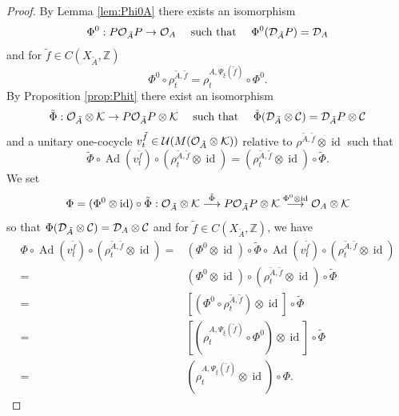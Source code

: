 \documentclass[11pt]{article}
\theoremstyle{plain}
\theoremstyle{definition}
\numberwithin{equation}{section}
\newcommand{\id}{\operatorname{id}}
\newcommand{\Ad}{\operatorname{Ad}}
\newcommand{\Z}{\mathbb{Z}}
\newcommand{\f}{\tilde{f}}
\begin{document}
\begin{proof}
By Lemma \ref{lem:Phi0A}
there exists an isomorphism
\begin{equation*}
\Phi^0: P{{\mathcal{O}}_{\tilde{A}}} P \rightarrow {{\mathcal{O}}_A}
\quad
\text{ such that }
\quad
\Phi^0({{\mathcal{D}}_{\tilde{A}}} P) = {{\mathcal{D}}_A}
\end{equation*}
and for $ \f \in C(X_{\tilde{A}},\Z)$
\begin{equation*}
\Phi^0 \circ \rho^{\tilde{A},\f}_t = \rho^{A, \Psi_\xi(\f)}_t\circ \Phi^0.
\end{equation*}
By Proposition \ref{prop:Phit}
there exist an isomorphism
\begin{equation*}
\tilde{\Phi}:{{\mathcal{O}}_{\tilde{A}}\otimes{\mathcal{K}}} 
\rightarrow 
P{\mathcal{O}}_{\tilde{A}}P \otimes{\mathcal{K}}
\quad
\text{  such that }
\quad
 \tilde{\Phi}({{\mathcal{D}}_{\tilde{A}}\otimes{\mathcal{C}}}) = 
{\mathcal{D}}_{\tilde{A}}P \otimes{\mathcal{C}}
\end{equation*}
and 
a unitary one-cocycle
 $v_t^{\f} \in \U(M(\SOTA))$ 
 relative to 
$\rho^{\tilde{A},\f} \otimes\id$
such that 
\begin{equation*}
\tilde{\Phi} \circ \Ad(v_t^{\f}) \circ (\rho^{\tilde{A},\f}_t\otimes \id)
 = (\rho^{\tilde{A},\f}_t\otimes\id) \circ \tilde{\Phi}.
\end{equation*}
We set
\begin{equation*}
\Phi= ({\Phi^0}\otimes \id) \circ {\tilde{\Phi}} :
\SOTA 
\overset{\tilde{\Phi}}{\longrightarrow}
P{\mathcal{O}}_{\tilde{A}}P \otimes{\mathcal{K}}
\overset{{\Phi^0}\otimes \id}{\longrightarrow}
\SOA
\end{equation*}
so that 
$
\Phi({{\mathcal{D}}_{\tilde{A}}\otimes{\mathcal{C}}})
= {{\mathcal{D}}_A}\otimes{\mathcal{C}}
$
and for $\f \in C(X_{\tilde{A}},\Z)$, we have
\begin{align*}
\Phi\circ \Ad(v^{\f}_t) \circ (\rho^{{\tilde{A}}, \f}_t \otimes\id)
=&  ({\Phi^0}\otimes \id) \circ {\tilde{\Phi}} 
\circ \Ad(v^{\f}_t) \circ (\rho^{{\tilde{A}}, \f}_t \otimes\id) \\
=& ({\Phi^0}\otimes \id) \circ (\rho^{{\tilde{A}}, \f}_t 
\otimes\id)\circ {\tilde{\Phi}}\\
=& [({\Phi^0}\circ \rho^{{\tilde{A}},\f}_t)\otimes \id ]
\circ {\tilde{\Phi}}\\
=& [(\rho^{A,\Psi_\xi(\f)}_t\circ 
{\Phi^0})\otimes \id ]\circ {\tilde{\Phi}}\\
=& (\rho^{A,\Psi_\xi(\f)}_t\otimes \id)\circ \Phi.
\end{align*}
\end{proof}
\end{document}

